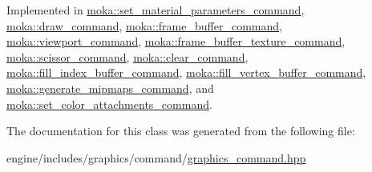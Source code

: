 Implemented in \mbox{\hyperlink{classmoka_1_1set__material__parameters__command_a00ba38678a50c8f1a80dfdc131a93ca7}{moka\+::set\+\_\+material\+\_\+parameters\+\_\+command}}, \mbox{\hyperlink{classmoka_1_1draw__command_a5182c69d730f0a34185e190b4e1ecf54}{moka\+::draw\+\_\+command}}, \mbox{\hyperlink{classmoka_1_1frame__buffer__command_a72a08b1f2f64f8f93458b4c70747f439}{moka\+::frame\+\_\+buffer\+\_\+command}}, \mbox{\hyperlink{classmoka_1_1viewport__command_a8344d1f3a278d8fe04f1f6c86d0877c1}{moka\+::viewport\+\_\+command}}, \mbox{\hyperlink{classmoka_1_1frame__buffer__texture__command_a13187e36d3002ccdaa39c42b40d0034f}{moka\+::frame\+\_\+buffer\+\_\+texture\+\_\+command}}, \mbox{\hyperlink{classmoka_1_1scissor__command_aae68551e35f929ea61bae3640af68ed8}{moka\+::scissor\+\_\+command}}, \mbox{\hyperlink{classmoka_1_1clear__command_a321fa172131c9219f1a8a57e228215fb}{moka\+::clear\+\_\+command}}, \mbox{\hyperlink{classmoka_1_1fill__index__buffer__command_aff2bfc0447ac04a037fb0626a93a81c6}{moka\+::fill\+\_\+index\+\_\+buffer\+\_\+command}}, \mbox{\hyperlink{classmoka_1_1fill__vertex__buffer__command_a9e916e2371a2a165e1450f635dd534a9}{moka\+::fill\+\_\+vertex\+\_\+buffer\+\_\+command}}, \mbox{\hyperlink{classmoka_1_1generate__mipmaps__command_af04e36f3f51d7ba505c3f157ceefb42c}{moka\+::generate\+\_\+mipmaps\+\_\+command}}, and \mbox{\hyperlink{classmoka_1_1set__color__attachments__command_a54f81dc588ded92764ce28c37fa576c6}{moka\+::set\+\_\+color\+\_\+attachments\+\_\+command}}.



The documentation for this class was generated from the following file\+:\begin{DoxyCompactItemize}
\item 
engine/includes/graphics/command/\mbox{\hyperlink{graphics__command_8hpp}{graphics\+\_\+command.\+hpp}}\end{DoxyCompactItemize}
